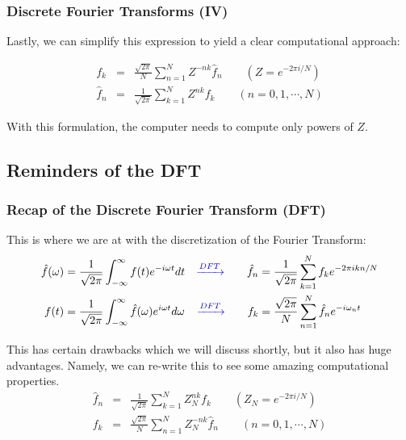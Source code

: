 \documentclass[hyperref={colorlinks=true}]{beamer}
\begin{document}

\begin{frame}%
  \frametitle{Discrete Fourier Transforms (IV)}

  Lastly, we can simplify this expression to yield a clear computational approach:
      
  \begin{eqnarray}
    f_k       &=& \frac{\sqrt{2\pi}}{N} \sum_{n=1}^{N} Z^{-nk}\hat{f}_{n} \qquad (Z=e^{-2\pi i/N}) \\
    \hat{f}_n &=& \frac{1}{\sqrt{2\pi}} \sum_{k=1}^{N} Z^{nk} f_k \qquad (n=0,1,\cdots,N) 
  \end{eqnarray}
  
  With this formulation, the computer needs to compute only powers of $Z$.
  
\end{frame}


\subsection[Recap of the DFT]{Reminders of the DFT}

\begin{frame}%
  \frametitle{Recap of the Discrete Fourier Transform (DFT)}

  This is where we are at with the discretization of the Fourier Transform:
  \begin{align}
    \hat{f}(\omega) &=   \frac{1}{\sqrt{2\pi}} \int_{-\infty}^{\infty} f(t) e^{-i\omega t} dt %
      &\textcolor{blue}{\xrightarrow{DFT}} \qquad \hat{f}_n &= \frac{1}{\sqrt{2\pi}} \sum_{k=1}^{N}  f_k  e^{-2\pi i k n/N}  \\
    f(t)            &=   \frac{1}{\sqrt{2\pi}} \int_{-\infty}^{\infty} \hat{f}(\omega) e^{i \omega t } d\omega %
      &\textcolor{blue}{\xrightarrow{DFT}} \qquad f_k &= \frac{\sqrt{2\pi}}{N} \sum_{n=1}^{N} \hat{f}_n  e^{-i\omega_n t}
  \end{align}

  This has certain drawbacks which we will discuss shortly, but it also has huge advantages. Namely, we can re-write this to see some amazing computational properties.
  \begin{eqnarray}
    \hat{f}_n &=& \frac{1}{\sqrt{2\pi}} \sum_{k=1}^{N} Z_{N}^{nk} f_k \qquad (Z_{N}=e^{-2\pi i/N}) \label{eq:simple-ft}\\
    f_k       &=& \frac{\sqrt{2\pi}}{N} \sum_{n=1}^{N} Z_{N}^{-nk}\hat{f}_{n}  \qquad (n=0,1,\cdots,N)  \label{eq:simple-ift}
  \end{eqnarray}

\end{frame}
\end{document}
